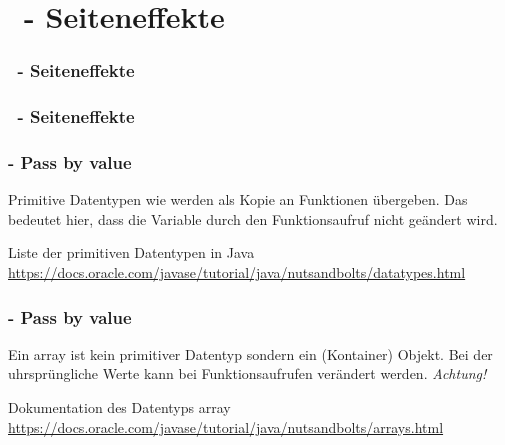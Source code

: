 \def\stitle{\theexercise\ - Seiteneffekte}
\section{\stitle}
\begin{frame}
  \frametitle{\stitle}%
\tableofcontents[current]
\end{frame}

\begin{frame}[t]%
    \frametitle{\stitle}

  

\end{frame}

\begin{frame}[t]%
\frametitle{\theexercise - Pass by value}

Primitive Datentypen wie  werden als Kopie an Funktionen übergeben.
Das bedeutet hier, dass die Variable  durch den Funktionsaufruf nicht geändert wird.


Liste der primitiven Datentypen in Java \textcolor{KITblue}{\url{https://docs.oracle.com/javase/tutorial/java/nutsandbolts/datatypes.html}}
\end{frame}


\begin{frame}[t]%
\frametitle{\theexercise - Pass by value}

Ein array ist kein primitiver Datentyp sondern ein (Kontainer) Objekt.
Bei der uhrsprüngliche Werte kann bei Funktionsaufrufen verändert werden.
\emph{Achtung!}


Dokumentation des Datentyps array \textcolor{KITblue}{\url{https://docs.oracle.com/javase/tutorial/java/nutsandbolts/arrays.html}}

\end{frame}
